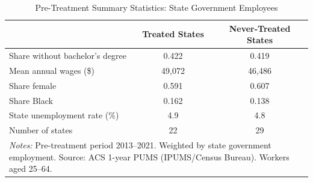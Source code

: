 \begin{table}[htbp]
\centering
\caption{Pre-Treatment Summary Statistics: State Government Employees}
\label{tab:summary}
\begin{tabular}{lcc}
\hline\hline
 & Treated States & Never-Treated States \\
\hline
Share without bachelor's degree & 0.422 & 0.419 \\
Mean annual wages (\$) & 49,072 & 46,486 \\
Share female & 0.591 & 0.607 \\
Share Black & 0.162 & 0.138 \\
State unemployment rate (\%) & 4.9 & 4.8 \\
Number of states & 22 & 29 \\
\hline\hline
\multicolumn{3}{p{10cm}}{\footnotesize \textit{Notes:} Pre-treatment period 2013--2021. Weighted by state government employment. Source: ACS 1-year PUMS (IPUMS/Census Bureau). Workers aged 25--64.}
\end{tabular}
\end{table}
